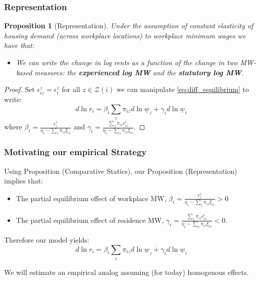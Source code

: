 \documentclass[aspectratio=169, t]{beamer}
\newtheorem{prop}{Proposition}
\newcommand{\Z}{\mathcal{Z}}
\newcommand{\MW}{\underline{w}}
\begin{document}
\begin{frame}[label = representation_prop]
    \frametitle{Representation}
    
\begin{prop}[Representation]\label{prop:representation}
    Under the assumption of constant elasticity of housing demand (across workplace locations)
    to workplace minimum wages we have that:
    \begin{itemize}
        \item We can write the change in log rents as a function of the change in two 
        MW-based measures: the \textbf{experienced log MW} and the \textbf{statutory log MW}.
    \end{itemize}
\end{prop}

\pause
\vspace{2mm}

\begin{proof}
    Set $\epsilon_{iz}^z = \epsilon_i^z$ for all $z\in\Z(i)$ 
    we can manipulate \eqref{eq:diff_equilibrium} to write:
    \begin{equation} \label{eq:theory_represenation}
        d \ln r_i = \beta_i \sum_i \pi_{iz} d\ln \MW_z + \gamma_i d \ln \MW_i
    \end{equation}
    where $\beta_i = \frac{\epsilon_{i}^z}{\eta_{i} - \sum_z \pi_{iz} \xi_{iz}}$ 
    and $\gamma_i = \frac{\sum_z \pi_{iz} \epsilon_{iz}^i}{\eta_{i} 
            - \sum_z \pi_{iz} \xi_{iz}}$.
\end{proof}
\end{frame}

\begin{frame}
\frametitle{Motivating our empirical Strategy}
Using Proposition (Comparative Statics), our Proposition (Representation) implies that:
\begin{itemize}
    \item The partial equilibrium effect of workplace MW, $\beta_i = \frac{\epsilon_{i}^z}{\eta_{i} - \sum_z \pi_{iz} \xi_{iz}} > 0$
    \item The partial equilibrium effect of residence MW, $\gamma_i = \frac{\sum_z \pi_{iz} \epsilon_{iz}^i}{\eta_{i} 
            - \sum_z \pi_{iz} \xi_{iz}} < 0$.
\end{itemize}

Therefore our model yields:
	\begin{equation}
            d \ln r_i = \beta_i \sum_i \pi_{iz} d\ln \MW_z + \gamma_i d \ln \MW_i
        \end{equation}
        
We will estimate an empirical analog assuming (for today) homogenous effects.

\end{frame}
\end{document}
